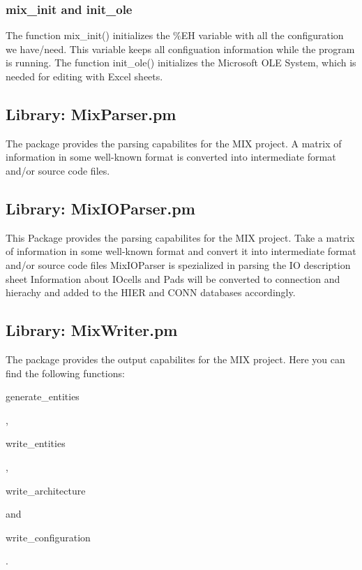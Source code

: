 \documentclass[a4paper,12pt]{article}
\begin{document}
\begin{tt}
\subsubsection{mix\_init and init\_ole}
The function mix\_init() initializes the \%EH variable with all the configuration we have/need. This variable keeps all configuation information while the program is running.\newline
The function init\_ole() initializes the Microsoft OLE System, which is needed for editing with Excel sheets.
\subsubsection{}


\subsection{Library: MixParser.pm}
The package provides the parsing capabilites for the MIX project. A matrix of information in some well-known format is converted into intermediate format and/or source code files.


\subsection{Library: MixIOParser.pm}
This Package provides the parsing capabilites for the MIX project. Take a matrix of information in some well-known format and convert it into intermediate format and/or source code files MixIOParser is spezialized in parsing the IO description sheet Information about IOcells and Pads will be converted to connection and hierachy and added to the HIER and CONN databases accordingly.


\subsection{Library: MixWriter.pm}
The package provides the output capabilites for the MIX project. Here you can find the following functions: \begin{it}generate\_entities\end{it}, \begin{it}write\_entities\end{it}, \begin{it}write\_architecture\end{it} and \begin{it}write\_configuration\end{it}.\newline



\end{tt}
\end{document}
